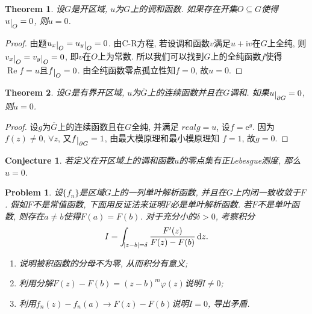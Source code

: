 \documentclass[a4paper, 12pt]{ctexart}
\newtheorem{theorem}{Theorem}[section]
\theoremstyle{plain}
\newtheorem{problem}{Problem}[section]
\newtheorem{conjecture}[proposition]{Conjecture}
\theoremstyle{plain}
\theoremstyle{plain}
\theoremstyle{nonumberplain}
\newtheorem{proof}{Proof}
\DeclareMathOperator*{\real}{Re}
\newcommand*{\diff}{\mathop{}\!\mathrm{d}}
\newcommand*{\me}{\mathrm{e}}
\newcommand*{\mi}{\mathrm{i}}
\newcommand*{\restrict}[1]{\raisebox{-.5ex}{$\vert$}_{#1}}
\begin{document}
    \begin{theorem}
        设$G$是开区域, $u$为$G$上的调和函数. 如果存在开集$O\subseteq G$使得
        $u\restrict{O}=0$, 则$u=0$.
    \end{theorem}

    \begin{proof}
        由题$u_{x}\restrict{O}=u_{y}\restrict{O}=0$.
        由C-R方程, 若设调和函数$v$满足$u+\mi v$在$G$上全纯,
        则$v_{x}\restrict{O}=v_{y}\restrict{O}=0$, 即$v$在$O$上为常数.
        所以我们可以找到$G$上的全纯函数$f$使得$\real{f}=u$且$f\restrict{O}=0$.
        由全纯函数零点孤立性知$f=0$, 故$u=0$.
    \end{proof}

    \begin{theorem}
        设$G$是有界开区域, $u$为$\overline{G}$上的连续函数并且在$G$调和.
        如果$u\restrict{\partial G}=0$, 则$u=0$.
    \end{theorem}

    \begin{proof}
        设$g$为$\overline{G}$上的连续函数且在$G$全纯, 并满足
        $real{g}=u$, 设$f=\me^{g}$. 因为$f(z)\neq 0$, $\forall z$,
        又$f\restrict{\partial G}=1$, 由最大模原理和最小模原理知
        $f=1$, 故$g=0$.
    \end{proof}

    \begin{conjecture}
        若定义在开区域上的调和函数$u$的零点集有正Lebesgue测度, 那么$u=0$.
    \end{conjecture}

    \begin{problem}
        设$\{f_{n}\}$是区域$G$上的一列单叶解析函数, 并且在$G$上内闭一致收敛于$F$.
        假如$F$不是常值函数, 下面用反证法来证明$F$必是单叶解析函数.
        若$F$不是单叶函数, 则存在$a\neq b$使得$F(a)=F(b)$.
        对于充分小的$\delta>0$, 考察积分
        \begin{equation}
            I=\int_{\abs{z-b}=\delta}{\frac{F'(z)}{F(z)-F(b)}\diff{z}}.
        \end{equation}
        \begin{enumerate}[\hspace{2em}(1)]
            \item 说明被积函数的分母不为零, 从而积分有意义;
            \item 利用分解$F(z)-F(b)=(z-b)^{m}\varphi(z)$说明$I\neq 0$;
            \item 利用$f_{n}(z)-f_{n}(a)\to F(z)-F(b)$说明$I=0$, 导出矛盾.
        \end{enumerate}
    \end{problem}
\end{document}
